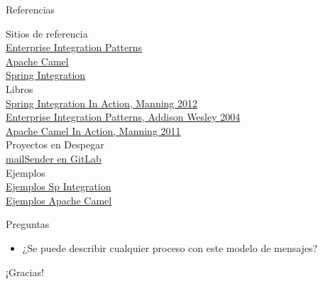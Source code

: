 \documentclass{beamer}
\begin{document}
\begin{frame}{Referencias}
\begin{center}
Sitios de referencia\\
\href{http://www.eaipatterns.com/}{Enterprise Integration Patterns} \\
\href{http://camel.apache.org/}{Apache Camel} \\
\href{http://projects.spring.io/spring-integration/}{Spring Integration} \\
Libros \\
\href{https://www.dropbox.com/s/gwa5p1edxpgudcz/Manning.Spring.Integration.in.Action.Sep.2012.pdf}{Spring Integration In Action, Manning 2012}  \\
\href{https://www.dropbox.com/s/zd9uft4ygbclehn/Addison.Wesley.Enterprise.Integration.Patterns.pdf}{Enterprise Integration Patterns, Addison Wesley 2004} \\
\href{https://www.dropbox.com/s/gjfegd85cvih78a/Manning.Camel.in.Action.Dec.2010.pdf}{Apache Camel In Action, Manning 2011} \\
Proyectos en Despegar \\
\href{http://gitlab.despegar.it/mail-checker/mail-checker}{mailSender en GitLab} \\
Ejemplos \\
\href{https://github.com/spring-projects/spring-integration-samples}{Ejemplos Sp Integration} \\
\href{http://camel.apache.org/examples.html}{Ejemplos Apache Camel}
\end{center}
\end{frame}

\begin{frame}{Preguntas}
\begin{itemize}
\item ¿Se puede describir cualquier proceso con este modelo de mensajes?
\end{itemize}
\end{frame}

\begin{frame}{¡Gracias!}
\end{frame}
\end{document}
